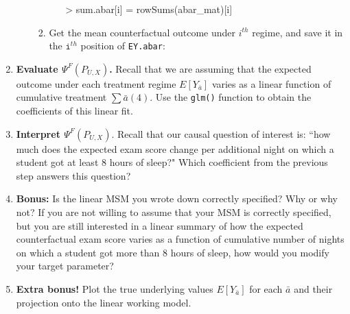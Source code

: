 \documentclass[answers]{exam}
\begin{document}
\begin{enumerate}
\begin{enumerate}
\begin{enumerate}
\begin{itemize}
\begin{Schunk}
\begin{Sinput}
> sum.abar[i] = rowSums(abar_mat)[i]
\end{Sinput}
\end{Schunk}
\end{itemize}
\item Get the mean counterfactual outcome under $i^{th}$ regime, and save it in the $\texttt{i}^{th}$ position of \texttt{EY.abar}:
\begin{Schunk}
\end{Schunk}
\end{enumerate}
\end{enumerate}

\noindent{}
\item \textbf{Evaluate $\Psi^F(P_{U,X})$.}  Recall that we are assuming that the expected outcome under each treatment regime $E[Y_{\bar{a}}]$ varies as a linear function of cumulative treatment $\sum\bar{a}(4)$. Use the \texttt{glm()} function to obtain the coefficients of this linear fit.
\item \textbf{Interpret $\Psi^F(P_{U,X})$}. Recall that our causal question of interest is: ``how much does the expected exam score change per additional night on which a student got at least 8 hours of sleep?" Which coefficient from the previous step answers this question?
\item \textbf{Bonus:} Is the linear MSM you wrote down correctly specified? Why or why not? If you are not willing to assume that your MSM is correctly specified, but you are still interested in a linear summary of how the expected counterfactual exam score varies as a function of cumulative number of nights on which a student got more than 8 hours of sleep, how would you modify your target parameter?
\item \textbf{Extra bonus!} Plot the true underlying values $E[Y_{\bar{a}}]$ for each $\bar{a}$ and their projection onto the linear working model.
\end{enumerate}
\end{document}
